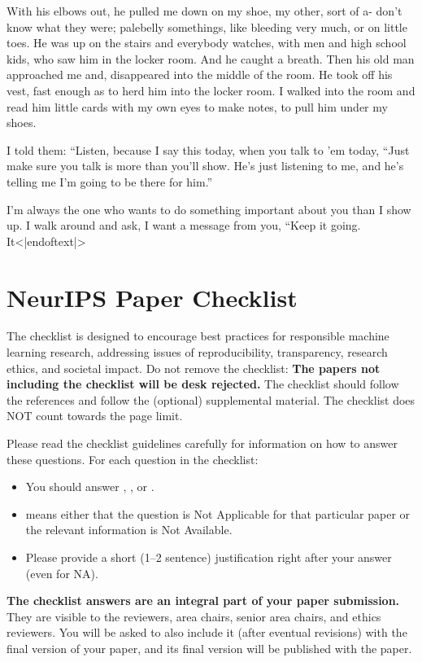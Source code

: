\documentclass{article} %
\begin{document}
{\begin{appendices}
{With his elbows out, he pulled me down on my shoe, my other, sort of a- don’t know what they were; palebelly somethings, like bleeding very much, or on little toes. He was up on the stairs and everybody watches, with men and high school kids, who saw him in the locker room. And he caught a breath. Then his old man approached me and, disappeared into the middle of the room. He took off his vest, fast enough as to herd him into the locker room. I walked into the room and read him little cards with my own eyes to make notes, to pull him under my shoes.

I told them: “Listen, because I say this today, when you talk to ’em today, “Just make sure you talk is more than you’ll show. He’s just listening to me, and he’s telling me I’m going to be there for him.”

I’m always the one who wants to do something important about you than I show up. I walk around and ask, I want a message from you, “Keep it going. It<|endoftext|>

}


\newpage

\section*{NeurIPS Paper Checklist}

The checklist is designed to encourage best practices for responsible machine learning research, addressing issues of reproducibility, transparency, research ethics, and societal impact. Do not remove the checklist: {\bf The papers not including the checklist will be desk rejected.} The checklist should follow the references and follow the (optional) supplemental material.  The checklist does NOT count towards the page
limit. 

Please read the checklist guidelines carefully for information on how to answer these questions. For each question in the checklist:
\begin{itemize}
    \item You should answer \answerYes{}, \answerNo{}, or \answerNA{}.
    \item \answerNA{} means either that the question is Not Applicable for that particular paper or the relevant information is Not Available.
    \item Please provide a short (1–2 sentence) justification right after your answer (even for NA). 
\end{itemize}

{\bf The checklist answers are an integral part of your paper submission.} They are visible to the reviewers, area chairs, senior area chairs, and ethics reviewers. You will be asked to also include it (after eventual revisions) with the final version of your paper, and its final version will be published with the paper.


\end{appendices}}
\end{document}
